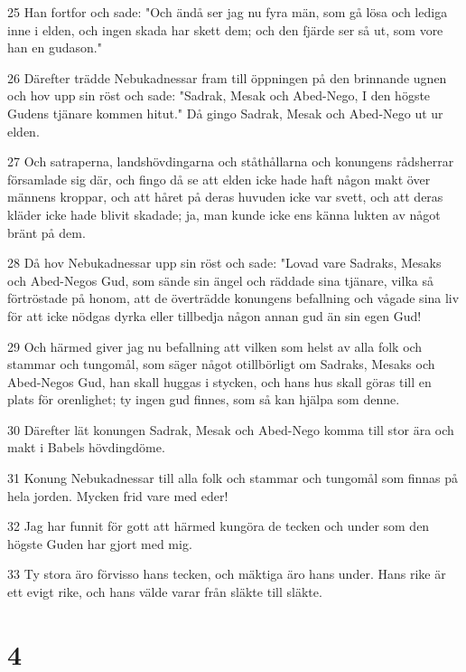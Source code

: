 \par 25 Han fortfor och sade: "Och ändå ser jag nu fyra män, som gå lösa och lediga inne i elden, och ingen skada har skett dem; och den fjärde ser så ut, som vore han en gudason."
\par 26 Därefter trädde Nebukadnessar fram till öppningen på den brinnande ugnen och hov upp sin röst och sade: "Sadrak, Mesak och Abed-Nego, I den högste Gudens tjänare kommen hitut." Då gingo Sadrak, Mesak och Abed-Nego ut ur elden.
\par 27 Och satraperna, landshövdingarna och ståthållarna och konungens rådsherrar församlade sig där, och fingo då se att elden icke hade haft någon makt över männens kroppar, och att håret på deras huvuden icke var svett, och att deras kläder icke hade blivit skadade; ja, man kunde icke ens känna lukten av något bränt på dem.
\par 28 Då hov Nebukadnessar upp sin röst och sade: "Lovad vare Sadraks, Mesaks och Abed-Negos Gud, som sände sin ängel och räddade sina tjänare, vilka så förtröstade på honom, att de överträdde konungens befallning och vågade sina liv för att icke nödgas dyrka eller tillbedja någon annan gud än sin egen Gud!
\par 29 Och härmed giver jag nu befallning att vilken som helst av alla folk och stammar och tungomål, som säger något otillbörligt om Sadraks, Mesaks och Abed-Negos Gud, han skall huggas i stycken, och hans hus skall göras till en plats för orenlighet; ty ingen gud finnes, som så kan hjälpa som denne.
\par 30 Därefter lät konungen Sadrak, Mesak och Abed-Nego komma till stor ära och makt i Babels hövdingdöme.
\par 31 Konung Nebukadnessar till alla folk och stammar och tungomål som finnas på hela jorden. Mycken frid vare med eder!
\par 32 Jag har funnit för gott att härmed kungöra de tecken och under som den högste Guden har gjort med mig.
\par 33 Ty stora äro förvisso hans tecken, och mäktiga äro hans under. Hans rike är ett evigt rike, och hans välde varar från släkte till släkte.

\chapter{4}

